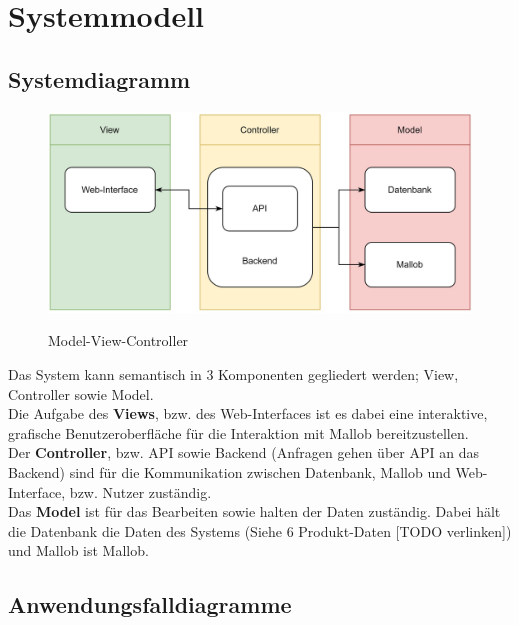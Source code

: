 \section{Systemmodell}

\subsection{Systemdiagramm}

\begin{figure}[H]
    \centering
    \includegraphics[width=\textwidth]{images-interface/Systemdiagramm2.jpg} \\
    \caption{Model-View-Controller}
\end{figure}
Das System kann semantisch in 3 Komponenten gegliedert werden; View, Controller sowie Model. \\
Die Aufgabe des \textbf{Views}, bzw. des Web-Interfaces ist es dabei eine interaktive, grafische Benutzeroberfläche für die Interaktion mit Mallob bereitzustellen. \\
Der \textbf{Controller}, bzw. API sowie Backend (Anfragen gehen über API an das Backend) sind für die Kommunikation zwischen Datenbank, Mallob und Web-Interface, bzw. Nutzer zuständig. \\
Das \textbf{Model} ist für das Bearbeiten sowie halten der Daten zuständig. Dabei hält die Datenbank die Daten des Systems (Siehe 6 Produkt-Daten [TODO verlinken]) und Mallob ist Mallob.

\pagebreak

\subsection{Anwendungsfalldiagramme}

